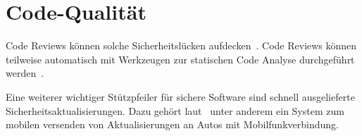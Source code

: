 \section{Code-Qualität}
Code Reviews können solche Sicherheitslücken aufdecken~\cite{Howard2006}.
Code Reviews können teilweise automatisch mit Werkzeugen zur statischen Code
Analyse durchgeführt werden~\cite{McGraw2008}.

Eine weiterer wichtiger Stützpfeiler für sichere Software sind schnell
ausgelieferte Sicherheitsaktualisierungen. Dazu gehört laut~\cite{Mahaffey2015}
unter anderem ein System zum mobilen versenden von Aktualisierungen an Autos
mit Mobilfunkverbindung.